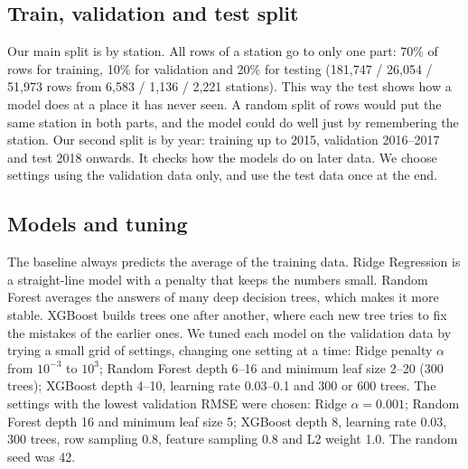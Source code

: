 \documentclass[11pt,a4paper]{article}
\begin{document}
\subsection{Train, validation and test split}
Our main split is by station. All rows of a station go to only one part: 70\% of rows for training, 10\% for validation and 20\% for testing (181,747 / 26,054 / 51,973 rows from 6,583 / 1,136 / 2,221 stations). This way the test shows how a model does at a place it has never seen. A random split of rows would put the same station in both parts, and the model could do well just by remembering the station. Our second split is by year: training up to 2015, validation 2016--2017 and test 2018 onwards. It checks how the models do on later data. We choose settings using the validation data only, and use the test data once at the end.

\subsection{Models and tuning}
The baseline always predicts the average of the training data. Ridge Regression is a straight-line model with a penalty that keeps the numbers small. Random Forest averages the answers of many deep decision trees, which makes it more stable. XGBoost builds trees one after another, where each new tree tries to fix the mistakes of the earlier ones. We tuned each model on the validation data by trying a small grid of settings, changing one setting at a time: Ridge penalty $\alpha$ from $10^{-3}$ to $10^{3}$; Random Forest depth 6--16 and minimum leaf size 2--20 (300 trees); XGBoost depth 4--10, learning rate 0.03--0.1 and 300 or 600 trees. The settings with the lowest validation RMSE were chosen: Ridge $\alpha=0.001$; Random Forest depth 16 and minimum leaf size 5; XGBoost depth 8, learning rate 0.03, 300 trees, row sampling 0.8, feature sampling 0.8 and L2 weight 1.0. The random seed was 42.
\end{document}
